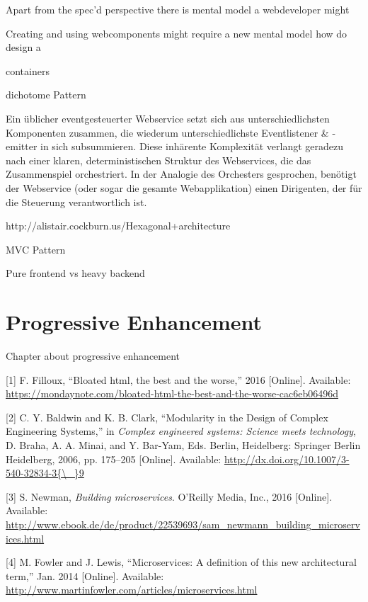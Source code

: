 \documentclass[]{assets/latex/ieee}
\begin{document}
Apart from the spec'd perspective there is mental model a webdeveloper
might

Creating and using webcomponents might require a new mental model how do
design a

containers

dichotome Pattern

Ein üblicher eventgesteuerter Webservice setzt sich aus
unterschiedlichsten Komponenten zusammen, die wiederum
unterschiedlichste Eventlistener \& -emitter in sich subsummieren. Diese
inhärente Komplexität verlangt geradezu nach einer klaren,
deterministischen Struktur des Webservices, die das Zusammenspiel
orchestriert. In der Analogie des Orchesters gesprochen, benötigt der
Webservice (oder sogar die gesamte Webapplikation) einen Dirigenten, der
für die Steuerung verantwortlich ist.

http://alistair.cockburn.us/Hexagonal+architecture

MVC Pattern

Pure frontend vs heavy backend

\section{Progressive Enhancement}\label{progressive-enhancement}

Chapter about progressive enhancement

\hypertarget{refs}{}
\hypertarget{ref-Filloux2016}{}
{[}1{]} F. Filloux, ``Bloated html, the best and the worse,'' 2016
{[}Online{]}. Available:
\url{https://mondaynote.com/bloated-html-the-best-and-the-worse-cac6eb06496d}

\hypertarget{ref-Baldwin2006}{}
{[}2{]} C. Y. Baldwin and K. B. Clark, ``Modularity in the Design of
Complex Engineering Systems,'' in \emph{Complex engineered systems:
Science meets technology}, D. Braha, A. A. Minai, and Y. Bar-Yam, Eds.
Berlin, Heidelberg: Springer Berlin Heidelberg, 2006, pp. 175--205
{[}Online{]}. Available:
\href{http://dx.doi.org/10.1007/3-540-32834-3\%7B/_\%7D9}{http://dx.doi.org/10.1007/3-540-32834-3\{\textbackslash{}\_\}9}

\hypertarget{ref-Newman2015}{}
{[}3{]} S. Newman, \emph{Building microservices}. O'Reilly Media, Inc.,
2016 {[}Online{]}. Available:
\url{http://www.ebook.de/de/product/22539693/sam_newmann_building_microservices.html}

\hypertarget{ref-Fowler2014}{}
{[}4{]} M. Fowler and J. Lewis, ``Microservices: A definition of this
new architectural term,'' Jan. 2014 {[}Online{]}. Available:
\url{http://www.martinfowler.com/articles/microservices.html}
\end{document}
